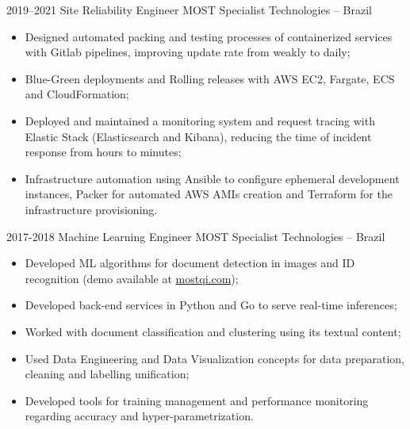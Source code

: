 \documentclass[a4paper]{cv-friggeri-x}
\begin{document}
\begin{entrylist}
\entry
    {2019--2021}
    {Site Reliability Engineer}
    {MOST Specialist Technologies -- Brazil}
    {\begin{itemize}
        \item Designed automated packing and testing processes of containerized services with Gitlab pipelines, improving update rate from weakly to daily;
        \item Blue-Green deployments and Rolling releases with AWS EC2, Fargate, ECS and CloudFormation;
        \item Deployed and maintained a monitoring system and request tracing with Elastic Stack (Elasticsearch and Kibana), reducing the time of incident response from hours to minutes;
        \item Infrastructure automation using Ansible to configure ephemeral development instances, Packer for automated AWS AMIs creation and Terraform for the infrastructure provisioning.
    \end{itemize}}

\entry
    {2017-2018}
    {Machine Learning Engineer}
    {MOST Specialist Technologies -- Brazil}
    {\begin{itemize}
        \item Developed ML algorithms for document detection in images and ID recognition (demo available at \href{mostqi.com}{mostqi.com});
        \item Developed back-end services in Python and Go to serve real-time inferences;
        \item Worked with document classification and clustering using its textual content;
        \item Used Data Engineering and Data Visualization concepts for data preparation, cleaning and labelling unification;
        \item Developed tools for training management and performance monitoring regarding accuracy and hyper-parametrization.
    \end{itemize}}







\end{entrylist}
\end{document}
